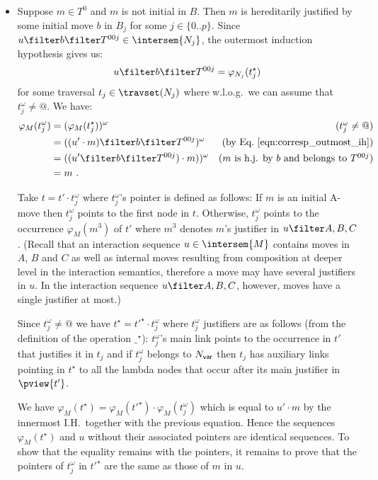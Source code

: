 \begin{enumerate}[$\bullet$]
\begin{enumerate}
\begin{itemize}
    \item Suppose $m\in T^0$ and $m$ is not initial in $B$. Then $m$ is hereditarily justified by some initial move $b$ in $B_j$ for some $j\in \{0..p\}$.
        Since $u \filter b \filter T^{00j} \in \intersem{N_j}$, the outermost induction hypothesis gives us:
        \begin{equation}
        u \filter b \filter T^{00j} = \varphi_{N_j}(t_j^\star)  \label{eqn:corresp_outmost_ih}
        \end{equation}
          for some traversal $t_j \in \travset(N_j)$ where w.l.o.g.\ we can assume that $t_j^\omega \neq @$. We have:
        \begin{align*}
            \varphi_M (t_j^\omega) &= (\varphi_M (t_j^\star))^\omega & \mbox{($t_j^\omega \neq @$)}\\
                                   &= ((u' \cdot m) \filter b\filter T^{00j})^\omega & \mbox{(by Eq.\ \ref{eqn:corresp_outmost_ih})}\\
                                   &= ((u' \filter b\filter T^{00j}) \cdot m))^\omega & \mbox{($m$ is h.j. by $b$ and belongs to $T^{00j}$)}\\
                                   &= m \ .
        \end{align*}

        Take $t = t'\cdot t_j^\omega$ where $t_j^\omega$'s pointer is defined as follows:
If $m$ is an initial A-move then $t_j^\omega$ points to the first node in $t$.
Otherwise, $t_j^\omega$ points to the occurrence $\varphi_M(m^3)$ of $t'$
where $m^3$ denotes $m$'s justifier in $u \filter A,B,C$. (Recall that an interaction sequence $u \in \intersem{M}$ contains moves in $A$, $B$ and $C$ as well as internal moves resulting from composition at deeper level in the interaction semantics,
therefore a move may have several justifiers in $u$. In the interaction sequence $u\filter A,B,C$, however, moves have a single justifier at most.)
\smallskip

Since $t_j^\omega \neq @$ we have  $t^\star = t'^\star \cdot t_j^\omega$ where
$t_j^\omega$ justifiers are as follows (from the definition of the operation $\_^\star$):
$t_j^\omega$'s main link points to the occurrence in $t'$ that justifies it in $t_j$ and if $t_j^\omega$ belongs to $N_{\sf var}$ then $t_j$ has auxiliary links pointing in $t^\star$ to all the lambda nodes that occur after its main justifier in $\pview{t'}$.

We have $\varphi_{M}(t^\star) =  \varphi_{M}(t'^\star)  \cdot \varphi_{M}(t_j^\omega)$ which is equal to $u' \cdot m$
by the innermost I.H.\ together with the previous equation. Hence the sequences $\varphi_{M}(t^\star)$ and $u$
without their associated pointers are identical sequences.
To show that the equality remains with the pointers, it remains to prove that the pointers of $t_j^\omega$ in $t'^\star$ are the same as those of $m$ in $u$.


\end{itemize}
\end{enumerate}
\end{enumerate}

